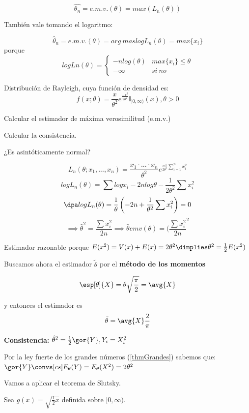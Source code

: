 \begin{problem}[11]
\[\hat{\theta_n} = e.m.v.(\theta) = max\left(L_n(\theta)\right)\]

También vale tomando el logaritmo:

\[\hat{\theta}_n = e.m.v. (\theta) = arg\ mas logL_n(\theta) = max\{x_i\}\]
porque \[ logLn(\theta) = \displaystyle\left\{\begin{array}{cc}
-nlog(\theta) & max\{x_i\} \leq \theta\\
-\infty & si \ no
\end{array}\right.\]
\end{problem}

\begin{problem}[5]
Distribución de Rayleigh, cuya función de densidad es:
\[f(x;\theta) = \frac{x}{\theta^2} e^{\frac{-x^2}{2\theta^2}} \mathbb{I}_{[0,\infty)} (x), \theta > 0\]

\ppart Calcular el estimador de máxima verosimilitud (e.m.v.)

\ppart Calcular la consistencia.

\ppart ¿Es asintóticamente normal?

\solution

\spart

\[L_n(\theta;x_1,...,x_n) = \frac{x_1 \cdot ... \cdot x_n}{\theta^2} e^{\frac{-1}{2\theta^2} \sum_{i=1}^n x_i^2}\]
\[log L_n(\theta) = \sum log x_i - 2nlog\theta -\frac{1}{2\theta^2}\sum x_i^2\]
\[\dpa log L_n(\theta) = \frac{1}{\theta} \left(-2n+\frac{1}{\theta^2}\sum x_i^2\right) = 0\]
\[\implies \hat{\theta}^2 = \frac{\sum x_i^2}{2n} \implies \hat{\theta} emv(\theta) = (\frac{\sum x_i^2}{2n}^2\]

Estimador razonable porque $E(x^2) = V(x) + E(x) = 2\theta^2 \dimplies \theta^2 = \frac{1}{2} E(x^2)$

Buscamos ahora el estimador $\tilde\theta$ por el \textbf{método de los momentos}

\[ \esp[\theta]{X}= \theta\sqrt{\frac{\pi}{2}} = \avg{X} \] 

y entonces el estimador es \[\tilde{\theta} = \avg{X}\frac{2}{\pi} \]

\spart

\textbf{Consistencia:} $\hat{\theta}^2 = \frac{1}{2} \gor{Y}, Y_i = X_i^2$

Por la ley fuerte de los grandes números (\ref{thmGrandes}) sabemos que: $\gor{Y} \convs[cs] E_{\theta}(Y) = E_{\theta}(X^2) = 2\theta^2$

Vamos a aplicar el teorema de Slutsky.

Sea $g(x) = \sqrt{\frac{1}{2}x}$ definida sobre $[0,\infty)$.


\end{problem}
